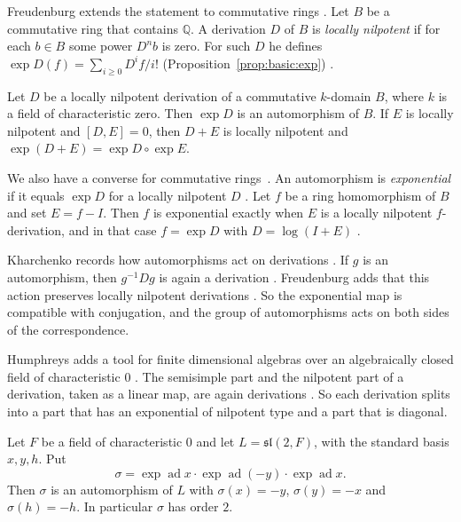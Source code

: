 Freudenburg extends the statement to commutative rings \cite[p.~12]{Freudenburg2017}. Let $B$ be a
commutative ring that contains $\mathbb{Q}$. A derivation $D$ of $B$ is
\emph{locally nilpotent} if for each $b \in B$ some power $D^n b$ is zero. For
such $D$ he defines $\exp D(f) = \sum_{i \ge 0} D^if/i!$ (Proposition~\ref{prop:basic:exp})
\cite[Section~1.1.9, p.~12]{Freudenburg2017}.\begin{proposition}\label{prop:basic:exp}
Let $D$ be a locally nilpotent derivation of a commutative $k$-domain $B$,
where $k$ is a field of characteristic zero. Then $\exp D$ is an automorphism of
$B$. If $E$ is locally nilpotent and $[D,E] = 0$, then $D+E$ is locally
nilpotent and $\exp(D+E) = \exp D \circ \exp E$.
\end{proposition}

We also have a converse for commutative rings~\cite[Proposition~2.57, p.~67]{Freudenburg2017}. An automorphism is
\emph{exponential} if it equals $\exp D$ for a locally nilpotent $D$
\cite[Section~2.10, p.~66]{Freudenburg2017}. Let $f$ be a ring homomorphism of
$B$ and set $E = f - I$. Then $f$ is exponential exactly when $E$ is a locally
nilpotent $f$-derivation, and in that case $f = \exp D$ with $D = \log(I+E)$
\cite[Proposition~2.57, p.~67]{Freudenburg2017}.

Kharchenko records how automorphisms act on derivations
\cite[p.~11]{Kharchenko1991}. If $g$ is an automorphism, then $g^{-1}Dg$ is
again a derivation \cite[p.~11]{Kharchenko1991}. Freudenburg adds that this
action preserves locally nilpotent derivations \cite[Principle~1(d),
p.~21]{Freudenburg2017}. So the exponential map is compatible with
conjugation, and the group of automorphisms acts on both sides of the
correspondence.

Humphreys adds a tool for finite dimensional algebras over an algebraically
closed field of characteristic $0$ \cite[\S4.2, Lemma~B]{Humphreys1972}. The
semisimple part and the nilpotent part of a derivation, taken as a linear map,
are again derivations \cite[\S4.2, Lemma~B]{Humphreys1972}. So each derivation
splits into a part that has an exponential of nilpotent type and a part that
is diagonal.

\begin{example}\label{ex:basic:sl2}
Let $F$ be a field of characteristic $0$ and let $L=\mathfrak{sl}(2,F)$, with the
standard basis $x,y,h$. Put
\[
\sigma=\exp\operatorname{ad}x\cdot\exp\operatorname{ad}(-y)\cdot\exp\operatorname{ad}x .
\]
Then $\sigma$ is an automorphism of $L$ with $\sigma(x)=-y$, $\sigma(y)=-x$ and
$\sigma(h)=-h$. In particular $\sigma$ has order $2$.
\end{example}

